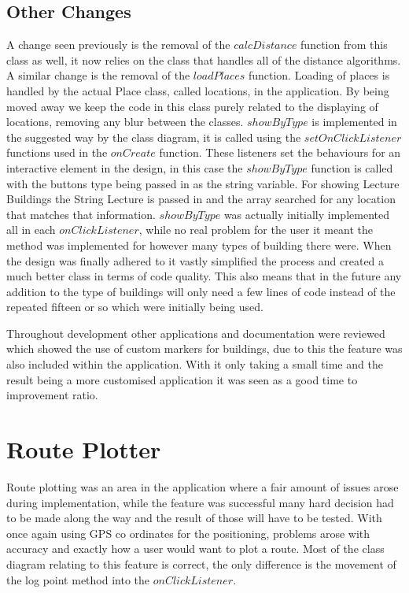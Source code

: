 \subsection{Other Changes}
A change seen previously is the removal of the $calcDistance$ function from this class as well, it now relies on the class that handles all of the distance algorithms. A similar change is the removal of the $loadPlaces$ function. Loading of places is handled by the actual Place class, called locations, in the application. By being moved away we keep the code in this class purely related to the displaying of locations, removing any blur between the classes. $showByType$ is implemented in the suggested way by the class diagram, it is called using the $setOnClickListener$ functions used in the $onCreate$ function. These listeners set the behaviours for an interactive element in the design, in this case the $showByType$ function is called with the buttons type being passed in as the string variable. For showing Lecture Buildings the String Lecture is passed in and the array searched for any location that matches that information. $showByType$ was actually initially implemented all in each $onClickListener$, while no real problem for the user it meant the method was implemented for however many types of building there were. When the design was finally adhered to it vastly simplified the process and created a much better class in terms of code quality. This also means that in the future any addition to the type of buildings will only need a few lines of code instead of the repeated fifteen or so which were initially being used. 

Throughout development other applications and documentation were reviewed which showed the use of custom markers for buildings, due to this the feature was also included within the application. With it only taking a small time and the result being a more customised application it was seen as a good time to improvement ratio. 

\section{Route Plotter}
Route plotting was an area in the application where a fair amount of issues arose during implementation, while the feature was successful many hard decision had to be made along the way and the result of those will have to be tested. With once again using GPS co ordinates for the positioning, problems arose with accuracy and exactly how a user would want to plot a route. Most of the class diagram relating to this feature is correct, the only difference is the movement of the log point method into the $onClickListener$.
